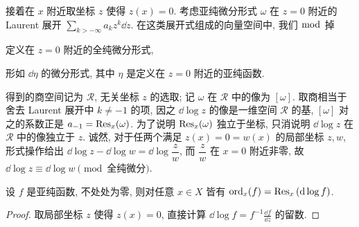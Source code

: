 接着在 $x$ 附近取坐标 $z$ 使得 $z(x)=0$. 考虑亚纯微分形式 $\omega$ 在 $z=0$ 附近的 Laurent 展开 $\sum_{k > -\infty} a_k z^k \dd z$. 在这类展开式组成的向量空间中, 我们 $\bmod$ 掉
\begin{compactenum}[(a)]
	\item 定义在 $z = 0$ 附近的全纯微分形式,
	\item 形如 $\dd\eta$ 的微分形式, 其中 $\eta$ 是定义在 $z = 0$ 附近的亚纯函数.
\end{compactenum}
得到的商空间记为 $\mathcal{R}$, 无关坐标 $z$ 的选取; 记 $\omega$ 在 $\mathcal{R}$ 中的像为 $[\omega]$. 取商相当于舍去 Laurent 展开中 $k \neq -1$ 的项, 因之 $\dd\log z$ 的像是一维空间 $\mathcal{R}$ 的基, $[\omega]$ 对之的系数正是 $a_{-1} = \operatorname{Res}_x(\omega)$. 为了说明 $\operatorname{Res}_x(\omega)$ 独立于坐标, 只消说明 $\dd\log z$ 在 $\mathcal{R}$ 中的像独立于 $z$. 诚然, 对于任两个满足 $z(x) = 0 = w(x)$ 的局部坐标 $z, w$, 形式操作给出 $\dd\log z - \dd\log w = \dd\log \dfrac{z}{w}$, 而 $\dfrac{z}{w}$ 在 $x = 0$ 附近非零, 故 $\dd \log z \equiv \dd \log w \pmod{\text{全纯微分}}$.

\begin{lemma}\label{prop:res-ord}
	设 $f$ 是亚纯函数, 不处处为零, 则对任意 $x \in X$ 皆有 $\mathrm{ord}_x(f) = \operatorname{Res}_x\left( \mathop{}\!\mathrm{d}\log f \right)$.
\end{lemma}
\begin{proof}
	取局部坐标 $z$ 使得 $z(x)=0$, 直接计算 $\dd \log f = f^{-1} \frac{\dd f}{\dd z}$ 的留数.
\end{proof}

